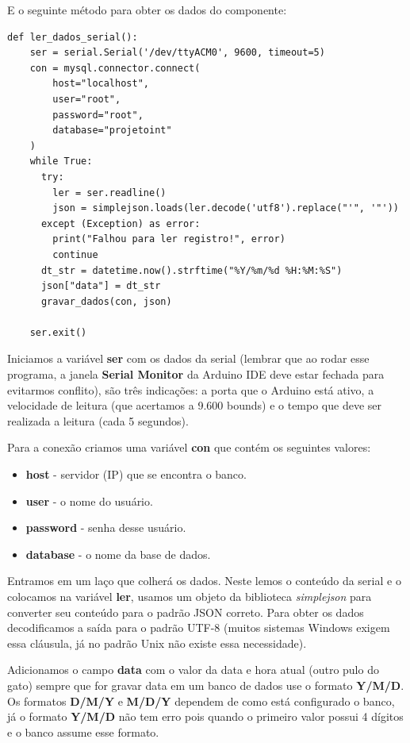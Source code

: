 \documentclass[a4paper,11pt]{article}
\begin{document}
E o seguinte método para obter os dados do componente:
\begin{lstlisting}[]
  def ler_dados_serial():
    ser = serial.Serial('/dev/ttyACM0', 9600, timeout=5)
    con = mysql.connector.connect(
        host="localhost",
        user="root",
        password="root",
        database="projetoint"
    )    
    while True:
      try:
        ler = ser.readline()
        json = simplejson.loads(ler.decode('utf8').replace("'", '"'))
      except (Exception) as error:
        print("Falhou para ler registro!", error)
        continue
      dt_str = datetime.now().strftime("%Y/%m/%d %H:%M:%S")
      json["data"] = dt_str
      gravar_dados(con, json)

    ser.exit()
\end{lstlisting}

Iniciamos a variável \textbf{ser} com os dados da serial (lembrar que ao rodar esse programa, a janela \textbf{Serial Monitor} da Arduino IDE deve estar fechada para evitarmos conflito), são três indicações: a porta que o Arduino está ativo, a velocidade de leitura (que acertamos a 9.600 bounds) e o tempo que deve ser realizada a leitura (cada 5 segundos). 

Para a conexão criamos uma variável \textbf{con} que contém os seguintes valores: \vspace{-1em}
\begin{itemize}[nolistsep]
	\item \textbf{host} - servidor (IP) que se encontra o banco.
	\item \textbf{user} - o nome do usuário.
	\item \textbf{password} - senha desse usuário.
	\item \textbf{database} - o nome da base de dados.
\end{itemize}

Entramos em um laço que colherá os dados. Neste lemos o conteúdo da serial e o colocamos na variável \textbf{ler}, usamos um objeto da biblioteca \textit{simplejson} para converter seu conteúdo para o padrão JSON correto. Para obter os dados decodificamos a saída para o padrão UTF-8 (muitos sistemas Windows exigem essa cláusula, já no padrão Unix não existe essa necessidade). 

Adicionamos o campo \textbf{data} com o valor da data e hora atual (outro pulo do gato) sempre que for gravar data em um banco de dados use o formato \textbf{Y/M/D}. Os formatos \textbf{D/M/Y} e \textbf{M/D/Y} dependem de como está configurado o banco, já o formato \textbf{Y/M/D} não tem erro pois quando o primeiro valor possui 4 dígitos e o banco assume esse formato. 
\end{document}
